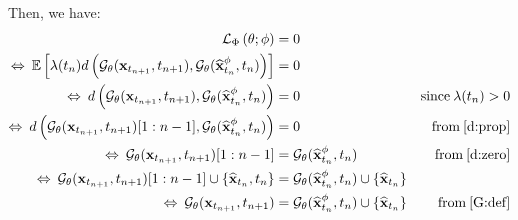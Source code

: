 \noindent Then, we have:
\begin{align}
    \mathcal{L}_{\Phi}\left(\theta; \phi \right) & = 0 \\
    \Leftrightarrow \: \mathbb{E}\left[ \lambda(t_n) d \left(\mathcal{G}_{\theta}(\mathbf{x}_{t_{n+1}}, t_{n+1}), \mathcal{G}_{\theta}(\widehat{\mathbf{x}}_{t_{n}}^{\phi}, t_{n}) \right)\right] & = 0 \\
    \Leftrightarrow \: d \left(\mathcal{G}_{\theta}(\mathbf{x}_{t_{n+1}}, t_{n+1}), \mathcal{G}_{\theta}(\widehat{\mathbf{x}}_{t_{n}}^{\phi}, t_{n}) \right) & = 0 & \text{since} \: \lambda(t_n) > 0 \\
    \Leftrightarrow \: d \left(\mathcal{G}_{\theta}(\mathbf{x}_{t_{n+1}}, t_{n+1})[1:n-1], \mathcal{G}_{\theta}(\widehat{\mathbf{x}}_{t_{n}}^{\phi}, t_{n}) \right) & = 0 & \text{from} \: \ref{d:prop}  \\
    \Leftrightarrow \: \mathcal{G}_{\theta}(\mathbf{x}_{t_{n+1}}, t_{n+1})[1:n-1] &= \mathcal{G}_{\theta}(\widehat{\mathbf{x}}_{t_{n}}^{\phi}, t_{n}) & \text{from} \: \ref{d:zero} \\
    \Leftrightarrow \: \mathcal{G}_{\theta}(\mathbf{x}_{t_{n+1}}, t_{n+1})[1:n-1] \cup \{\widehat{\mathbf{x}}_{t_n}, t_n \} &= \mathcal{G}_{\theta}(\widehat{\mathbf{x}}_{t_{n}}^{\phi}, t_{n}) \cup \{\widehat{\mathbf{x}}_{t_n} \} \\
    \Leftrightarrow \: \mathcal{G}_{\theta}(\mathbf{x}_{t_{n+1}}, t_{n+1}) &= \mathcal{G}_{\theta}(\widehat{\mathbf{x}}_{t_{n}}^{\phi}, t_{n}) \cup \{\widehat{\mathbf{x}}_{t_n} \}  & \text{from} \: \ref{G:def} \label{lphi:partial1}
\end{align}

